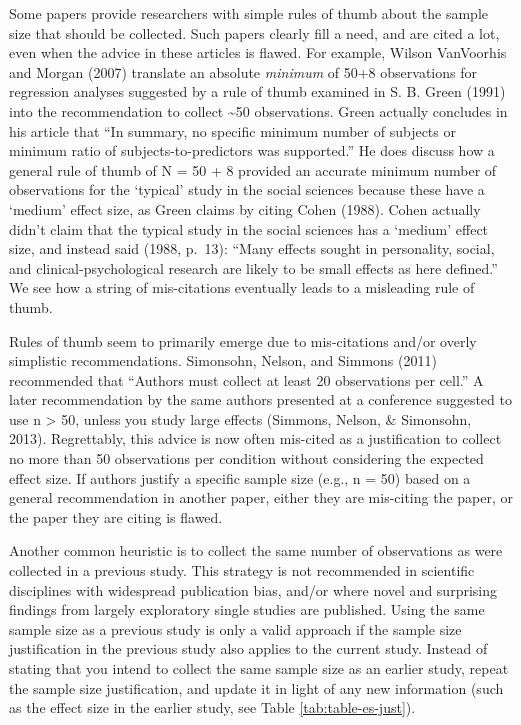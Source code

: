 \documentclass[
  english,
  ,jou,floatsintext]{apa6}
\begin{document}
Some papers provide researchers with simple rules of thumb about the sample size that should be collected. Such papers clearly fill a need, and are cited a lot, even when the advice in these articles is flawed. For example, Wilson VanVoorhis and Morgan (2007) translate an absolute \emph{minimum} of 50+8 observations for regression analyses suggested by a rule of thumb examined in S. B. Green (1991) into the recommendation to collect \textasciitilde50 observations. Green actually concludes in his article that ``In summary, no specific minimum number of subjects or minimum ratio of subjects-to-predictors was supported.'' He does discuss how a general rule of thumb of N = 50 + 8 provided an accurate minimum number of observations for the `typical' study in the social sciences because these have a `medium' effect size, as Green claims by citing Cohen (1988). Cohen actually didn't claim that the typical study in the social sciences has a `medium' effect size, and instead said (1988, p.~13): ``Many effects sought in personality, social, and clinical-psychological research are likely to be small effects as here defined.'' We see how a string of mis-citations eventually leads to a misleading rule of thumb.

Rules of thumb seem to primarily emerge due to mis-citations and/or overly simplistic recommendations. Simonsohn, Nelson, and Simmons (2011) recommended that ``Authors must collect at least 20 observations per cell.'' A later recommendation by the same authors presented at a conference suggested to use n \textgreater{} 50, unless you study large effects (Simmons, Nelson, \& Simonsohn, 2013). Regrettably, this advice is now often mis-cited as a justification to collect no more than 50 observations per condition without considering the expected effect size. If authors justify a specific sample size (e.g., n = 50) based on a general recommendation in another paper, either they are mis-citing the paper, or the paper they are citing is flawed.

Another common heuristic is to collect the same number of observations as were collected in a previous study. This strategy is not recommended in scientific disciplines with widespread publication bias, and/or where novel and surprising findings from largely exploratory single studies are published. Using the same sample size as a previous study is only a valid approach if the sample size justification in the previous study also applies to the current study. Instead of stating that you intend to collect the same sample size as an earlier study, repeat the sample size justification, and update it in light of any new information (such as the effect size in the earlier study, see Table \ref{tab:table-es-just}).
\end{document}
